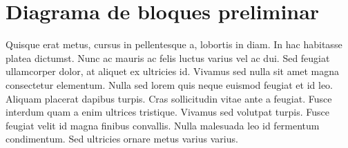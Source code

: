 \section{Diagrama de bloques preliminar}
\label{sec:diag_bloq}
Quisque erat metus, cursus in pellentesque a, lobortis in diam. In hac habitasse platea dictumst. Nunc ac mauris ac felis luctus varius vel ac dui. Sed feugiat ullamcorper dolor, at aliquet ex ultricies id. Vivamus sed nulla sit amet magna consectetur elementum. Nulla sed lorem quis neque euismod feugiat et id leo. Aliquam placerat dapibus turpis. Cras sollicitudin vitae ante a feugiat. Fusce interdum quam a enim ultrices tristique. Vivamus sed volutpat turpis. Fusce feugiat velit id magna finibus convallis. Nulla malesuada leo id fermentum condimentum. Sed ultricies ornare metus varius varius. 